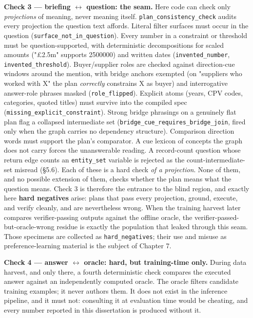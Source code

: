 \textbf{Check 3 --- briefing $\leftrightarrow$ question: the seam.} Here code can check only \emph{projections} of meaning, never meaning itself. \texttt{plan\_consistency\_check} audits every projection the question text affords. Literal filter surfaces must occur in the question (\texttt{surface\_not\_in\_question}). Every number in a constraint or threshold must be question-supported, with deterministic decompositions for scaled amounts ("£2.5m" supports 2500000) and written dates (\texttt{invented\_number}, \texttt{invented\_threshold}). Buyer/supplier roles are checked against direction-cue windows around the mention, with bridge anchors exempted (on "suppliers who worked with X" the plan \emph{correctly} constrains X as buyer) and interrogative answer-role phrases masked (\texttt{role\_flipped}). Explicit atoms (years, CPV codes, categories, quoted titles) must survive into the compiled spec (\texttt{missing\_explicit\_constraint}). Strong bridge phrasings on a genuinely flat plan flag a collapsed intermediate set (\texttt{bridge\_cue\_requires\_bridge\_join}, fired only when the graph carries no dependency structure). Comparison direction words must support the plan's comparator. A cue lexicon of concepts the graph does not carry forces the unanswerable reading. A record-count question whose return edge counts an \texttt{entity\_set} variable is rejected as the count-intermediate-set misread (§5.6). Each of these is a hard check \emph{of a projection}. None of them, and no possible extension of them, checks whether the plan means what the question means. Check 3 is therefore the entrance to the blind region, and exactly here \textbf{hard negatives} arise: plans that pass every projection, ground, execute, and verify cleanly, and are nevertheless wrong. When the training harvest later compares verifier-passing outputs against the offline oracle, the verifier-passed-but-oracle-wrong residue is exactly the population that leaked through this seam. Those specimens are collected as \texttt{hard\_negatives}; their use and misuse as preference-learning material is the subject of Chapter 7.

\textbf{Check 4 --- answer $\leftrightarrow$ oracle: hard, but training-time only.} During data harvest, and only there, a fourth deterministic check compares the executed answer against an independently computed oracle. The oracle filters candidate training examples; it never authors them. It does not exist in the inference pipeline, and it must not: consulting it at evaluation time would be cheating, and every number reported in this dissertation is produced without it.

